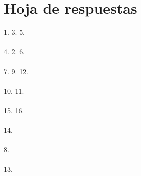 \documentclass{article}
\begin{document}
\section{Hoja de respuestas}
1. \underline{\hspace{1cm}} \hspace{1cm}  3. \underline{\hspace{1cm}}  \hspace{1cm} 5. \underline{\hspace{1cm}} \\~\\ 4. \underline{\hspace{1cm}} \hspace{1cm} 2. \underline{\hspace{1cm}}  \hspace{1cm} 6. \underline{\hspace{1cm}} \\~\\ 7. \underline{\hspace{1cm}} \hspace{1cm} 9. \underline{\hspace{1cm}}  \hspace{1cm} 12. \underline{\hspace{1cm}} \\~\\ 10. \underline{\hspace{1cm}} \hspace{1cm} 11. \underline{\hspace{1cm}}  \\~\\ 15. \underline{\hspace{1cm}} \hspace{1cm} 16. \underline{\hspace{1cm}} \\~\\ 14. \underline{\hspace{1cm}}  \\~\\ 8. \underline{\hspace{1cm}} \\~\\ 13. \underline{\hspace{1cm}}
\end{document}
